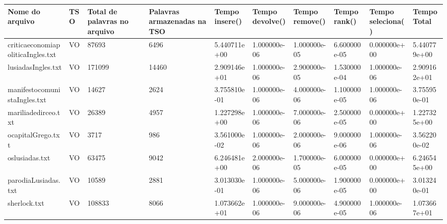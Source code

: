 \begin{tabular}{|l|l|l|l|l|l|l|l|l|l|}
\hline
Nome do arquivo&TSO&Total de palavras no arquivo&Palavras armazenadas na TSO&Tempo insere()&Tempo devolve()&Tempo remove()&Tempo rank()&Tempo seleciona()&Tempo Total\\
\hline
criticaeconomiapoliticaIngles.txt&VO&87693&6496&5.440711e+00&1.000000e-06&1.000000e-05&6.600000e-05&0.000000e+00&5.440779e+00\\
\hline
lusiadasIngles.txt&VO&171099&14460&2.909146e+01&1.000000e-06&2.900000e-05&1.530000e-04&1.000000e-06&2.909162e+01\\
\hline
manifestocomunistaIngles.txt&VO&14627&2624&3.755810e-01&1.000000e-06&4.000000e-06&1.100000e-05&1.000000e-06&3.755950e-01\\
\hline
mariliadedirceo.txt&VO&26389&4957&1.227298e+00&1.000000e-06&7.000000e-06&2.500000e-05&0.000000e+00&1.227325e+00\\
\hline
ocapitalGrego.txt&VO&3717&986&3.561000e-02&1.000000e-06&2.000000e-06&9.000000e-06&1.000000e-06&3.562200e-02\\
\hline
oslusiadas.txt&VO&63475&9042&6.246481e+00&2.000000e-06&1.700000e-05&6.000000e-05&0.000000e+00&6.246545e+00\\
\hline
parodiaLusiadas.txt&VO&10589&2881&3.013030e-01&1.000000e-06&5.000000e-06&1.900000e-05&0.000000e+00&3.013240e-01\\
\hline
sherlock.txt&VO&108833&8066&1.073662e+01&1.000000e-06&9.000000e-06&4.900000e-05&1.000000e-06&1.073667e+01\\
\hline
\end{tabular}
